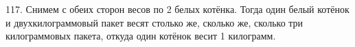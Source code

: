 117. Снимем с обеих сторон весов по 2 белых котёнка. Тогда один белый котёнок и двухкилограммовый пакет весят столько же, сколько же, сколько три килограммовых пакета, откуда один котёнок весит 1 килограмм.\\
